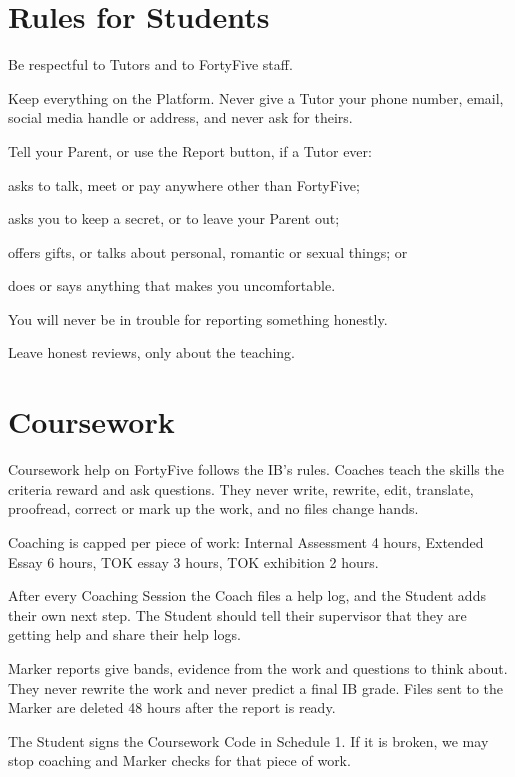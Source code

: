 \documentclass[11pt]{article}
\begin{document}
\section{Rules for Students}

\begin{clauses}
  \item Be respectful to Tutors and to FortyFive staff.
  \item Keep everything on the Platform. Never give a Tutor your phone number, email, social media handle or address, and never ask for theirs.
  \item Tell your Parent, or use the Report button, if a Tutor ever:
  \begin{clauses}
    \item asks to talk, meet or pay anywhere other than FortyFive;
    \item asks you to keep a secret, or to leave your Parent out;
    \item offers gifts, or talks about personal, romantic or sexual things; or
    \item does or says anything that makes you uncomfortable.
  \end{clauses}
  You will never be in trouble for reporting something honestly.
  \item Leave honest reviews, only about the teaching.
\end{clauses}

\section{Coursework}

\begin{clauses}
  \item Coursework help on FortyFive follows the IB's rules. Coaches teach the skills the criteria reward and ask questions. They never write, rewrite, edit, translate, proofread, correct or mark up the work, and no files change hands.
  \item Coaching is capped per piece of work: Internal Assessment 4 hours, Extended Essay 6 hours, TOK essay 3 hours, TOK exhibition 2 hours.
  \item After every Coaching Session the Coach files a help log, and the Student adds their own next step. The Student should tell their supervisor that they are getting help and share their help logs.
  \item Marker reports give bands, evidence from the work and questions to think about. They never rewrite the work and never predict a final IB grade. Files sent to the Marker are deleted 48 hours after the report is ready.
  \item The Student signs the Coursework Code in Schedule 1. If it is broken, we may stop coaching and Marker checks for that piece of work.
\end{clauses}
\end{document}
